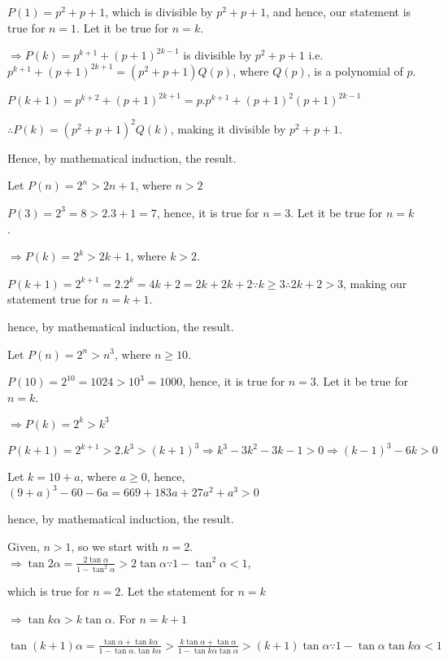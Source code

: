   $P(1) = p^2 + p + 1$, which is divisible by $p^2 + p + 1$, and hence, our statement is true for $n =
  1$. Let it be true for $n = k$.

  $\Rightarrow P(k) = p^{k + 1} + (p + 1)^{2k - 1}$ is divisible by $p^2 + p + 1$ i.e. $p^{k + 1} + (p + 1)^{2k + 1} =
  (p^2 + p + 1)Q(p)$, where $Q(p)$, is a polynomial of $p$.

  $P(k + 1) = p^{k + 2} + (p + 1)^{2k + 1} = p.p^{k + 1} + (p + 1)^2(p + 1)^{2k - 1}$

  $\therefore P(k) = (p^2 + p + 1)^2Q(k)$, making it divisible by $p^2 + p + 1$.

  Hence, by mathematical induction, the result.
\item Let $P(n) = 2^n > 2n + 1$, where $n > 2$

  $P(3) = 2^3 = 8 > 2.3 + 1 = 7$, hence, it is true for $n = 3$. Let it be true for $n = k$.

  $\Rightarrow P(k) = 2^k > 2k + 1$, where $k> 2$.

  $P(k + 1) = 2^{k + 1} = 2.2^k = 4k + 2 = 2k + 2k + 2 \because k \geq 3\therefore 2k + 2 > 3$, making our
  statement true for $n = k + 1$.

  hence, by mathematical induction, the result.
\item Let $P(n) = 2^n > n^3$, where $n \geq 10$.

  $P(10) = 2^{10} = 1024 > 10^3 = 1000$, hence, it is true for $n = 3$. Let it be true for $n = k$.

  $\Rightarrow P(k) = 2^k > k^3$

  $P(k + 1) = 2^{k + 1} > 2.k^3 >(k + 1)^3 \Rightarrow k^3 - 3k^2 - 3k - 1 > 0 \Rightarrow (k - 1)^3 - 6k > 0$

  Let $k = 10 + a$, where $a\geq 0$, hence, $(9 + a)^3 - 60 - 6a = 669 + 183a + 27a^2 + a^3 > 0$

  hence, by mathematical induction, the result.
\item Given, $n > 1$, so we start with $n = 2$. $\Rightarrow \tan2\alpha = \frac{2\tan\alpha}{1 -
  \tan^2\alpha}> 2\tan\alpha\because1 - \tan^2\alpha < 1$,

  which is true for $n = 2$. Let the statement for $n = k$

  $\Rightarrow \tan k\alpha > k\tan\alpha$. For $n = k + 1$

  $\tan(k + 1)\alpha = \frac{\tan\alpha + \tan k\alpha}{1 - \tan\alpha.\tan k\alpha}> \frac{k\tan\alpha +
    \tan\alpha}{1 - \tan k\alpha\tan\alpha} > (k + 1)\tan\alpha\because 1 - \tan\alpha\tan k\alpha < 1$

